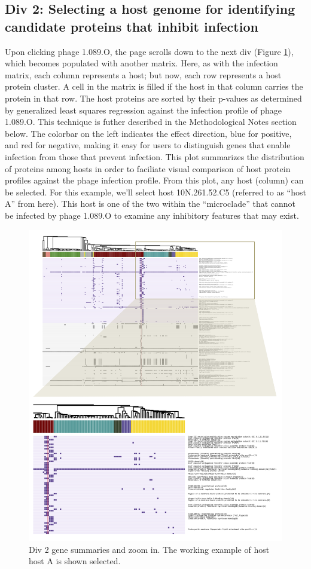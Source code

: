 \documentclass[12pt,twoside]{mitthesis-manusdown}
\begin{document}
\subsection{Div 2: Selecting a host genome for identifying candidate
proteins that inhibit
infection}\label{div-2-selecting-a-host-genome-for-identifying-candidate-proteins-that-inhibit-infection}

Upon clicking phage 1.089.O, the page scrolls down to the next div
(Figure \ref{fig:workflow2}), which becomes populated with another
matrix. Here, as with the infection matrix, each column represents a
host; but now, each row represents a host protein cluster. A cell in the
matrix is filled if the host in that column carries the protein in that
row. The host proteins are sorted by their p-values as determined by
generalized least squares regression against the infection profile of
phage 1.089.O. This technique is futher described in the Methodological
Notes section below. The colorbar on the left indicates the effect
direction, blue for positive, and red for negative, making it easy for
users to distinguish genes that enable infection from those that prevent
infection. This plot summarizes the distribution of proteins among hosts
in order to faciliate visual comparison of host protein profiles against
the phage infection profile. From this plot, any host (column) can be
selected. For this example, we'll select host 10N.261.52.C5 (referred to
as ``host A'' from here). This host is one of the two within the
``microclade'' that cannot be infected by phage 1.089.O to examine any
inhibitory features that may exist.
\begin{figure}[tb!]

{\centering \includegraphics[width=0.8\linewidth]{figuresviz/workflow2} 

}

\caption{\label{fig:workflow2}Div 2 gene summaries and zoom in. The working example of host host A is shown selected.}\label{fig:workflow2}
\end{figure}
\end{document}
